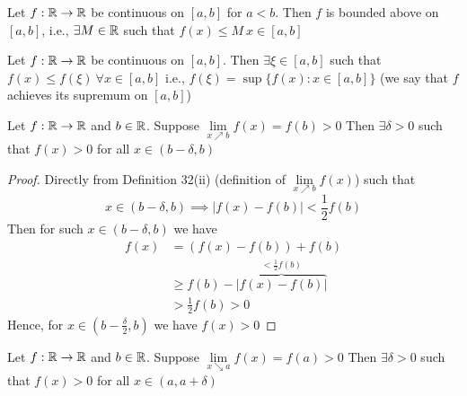 \begin{theorem}\label{thm:upbndcts}
    Let $f: \mathbb R \rightarrow \mathbb R$ be continuous on $\left[a, b\right]$ for $a < b$.
    Then $f$ is bounded above on $\left[a, b\right]$, i.e., $\exists M \in \mathbb R$ such that $f(x) \leq M\ x \in \left[a, b\right]$
\end{theorem}

\begin{theorem}\label{thm:supbndcts}
    Let $f: \mathbb R \rightarrow \mathbb R$ be continuous on $\left[a, b\right]$.
    Then $\exists \xi \in \left[a, b\right]$ such that $f(x) \leq f(\xi)\ \forall x \in \left[a, b\right]$
    i.e., $f(\xi)=\sup\{f(x): x\in\left[a, b\right]\}$
    (we say that $f$ achieves its supremum on $\left[a, b\right]$)
\end{theorem}

\begin{lemma*}[$35'$]
    Let $f: \mathbb R \rightarrow \mathbb R$ and $b \in \mathbb R$.
    Suppose $\lim\limits_{x \nearrow b} f(x) = f(b) > 0$
    Then $\exists \delta > 0$ such that $f(x) > 0$ for all $x \in (b - \delta, b)$
\end{lemma*}

\begin{proof}
    Directly from Definition 32(ii) (definition of $\lim\limits_{x \nearrow b} f(x)$) such that
    $$x \in (b - \delta, b) \implies |f(x) - f(b)| < \frac{1}{2} f(b)$$
    Then for such $x \in (b - \delta, b)$ we have 
    \begin{align*}
        f(x) &= (f(x) - f(b)) + f(b) \\
        & \geq f(b) - \overbrace{|f(x) - f(b)|}^{<\frac{1}{2}f(b)} \\
        &> \frac{1}{2} f(b) > 0
    \end{align*}
    Hence, for $x \in \left(b - \frac{\delta}{2}, b\right)$ we have $f(x) > 0$
\end{proof}

\begin{lemma*}[$35''$]
    Let $f: \mathbb R \rightarrow \mathbb R$ and $b \in \mathbb R$.
    Suppose $\lim\limits_{x \searrow a} f(x) = f(a) > 0$
    Then $\exists \delta > 0$ such that $f(x) > 0$ for all $x \in (a, a + \delta)$
\end{lemma*}


